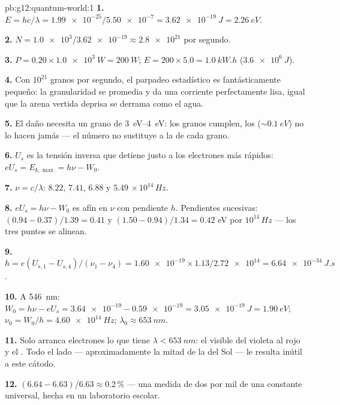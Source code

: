 \begin{solution}{pb:g12:quantum-world:1}
\textbf{1.} $E = hc/\lambda = \num{1.99e-25}/\num{5.50e-7} =
\qty{3.62e-19}{J} = \qty{2.26}{eV}$.

\textbf{2.} $N = \num{1.0e3}/\num{3.62e-19} \approx \num{2.8e21}$
 por segundo.

\textbf{3.} $P = 0.20 \times \qty{1.0e3}{W} = \qty{200}{W}$;
$E = 200 \times 5.0 = \qty{1.0}{kW.h}$ ($\qty{3.6e6}{J}$).

\textbf{4.} Con $10^{21}$ granos por segundo, el parpadeo estadístico es
fantásticamente pequeño: la granularidad se promedia y da una corriente
perfectamente lisa, igual que la arena vertida deprisa se derrama como
el agua.

\textbf{5.} El daño necesita un grano de \qtyrange{3}{4}{eV}: los granos
 cumplen, los  ($\sim \qty{0.1}{eV}$) no lo
hacen jamás --- el número no sustituye a la  de cada grano.

\textbf{6.} $U_s$ es la tensión inversa que detiene justo a los
electrones más rápidos: $eU_s = E_{k,\max} = h\nu - W_0$.

\textbf{7.} $\nu = c/\lambda$: $8.22$, $7.41$, $6.88$ y $5.49$
$\times\,10^{14}\,\unit{Hz}$.

\textbf{8.} $eU_s = h\nu - W_0$ es afín en $\nu$ con pendiente $h$.
Pendientes sucesivas: $(0.94 - 0.37)/1.39 = 0.41$ y
$(1.50 - 0.94)/1.34 = 0.42$ \unit{eV} por $10^{14}\,\unit{Hz}$ --- los
tres puntos se alinean.

\textbf{9.} $h = e(U_{s,1}-U_{s,4})/(\nu_1-\nu_4) = \num{1.60e-19}
\times 1.13/\num{2.72e14} = \qty{6.64e-34}{J.s}$.

\textbf{10.} A \qty{546}{nm}:
$W_0 = h\nu - eU_s = \num{3.64e-19} - \num{0.59e-19} =
\qty{3.05e-19}{J} = \qty{1.90}{eV}$;
$\nu_0 = W_0/h = \qty{4.60e14}{Hz}$; $\lambda_0 \approx \qty{653}{nm}$.

\textbf{11.} Solo arranca electrones lo que tiene
$\lambda < \qty{653}{nm}$: el visible del violeta al rojo y el
. Todo el lado  --- aproximadamente la mitad de la
 del Sol --- le resulta inútil a este cátodo.

\textbf{12.} $(6.64 - 6.63)/6.63 \approx 0.2\,\%$ --- una medida de dos
por mil de una constante universal, hecha en un laboratorio escolar.


\end{solution}
